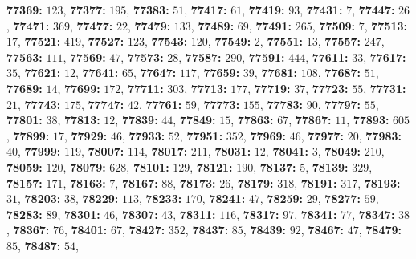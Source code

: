 \textsf{\bfseries 77369:} $123$, \textsf{\bfseries 77377:} $195$, \textsf{\bfseries 77383:} $51$, \textsf{\bfseries 77417:} $61$, \textsf{\bfseries 77419:} $93$, \textsf{\bfseries 77431:} $7$, \textsf{\bfseries 77447:} $26$, \textsf{\bfseries 77471:} $369$, \textsf{\bfseries 77477:} $22$, \textsf{\bfseries 77479:} $133$, \textsf{\bfseries 77489:} $69$, \textsf{\bfseries 77491:} $265$, \textsf{\bfseries 77509:} $7$, \textsf{\bfseries 77513:} $17$, \textsf{\bfseries 77521:} $419$, \textsf{\bfseries 77527:} $123$, \textsf{\bfseries 77543:} $120$, \textsf{\bfseries 77549:} $2$, \textsf{\bfseries 77551:} $13$, \textsf{\bfseries 77557:} $247$, \textsf{\bfseries 77563:} $111$, \textsf{\bfseries 77569:} $47$, \textsf{\bfseries 77573:} $28$, \textsf{\bfseries 77587:} $290$, \textsf{\bfseries 77591:} $444$, \textsf{\bfseries 77611:} $33$, \textsf{\bfseries 77617:} $35$, \textsf{\bfseries 77621:} $12$, \textsf{\bfseries 77641:} $65$, \textsf{\bfseries 77647:} $117$, \textsf{\bfseries 77659:} $39$, \textsf{\bfseries 77681:} $108$, \textsf{\bfseries 77687:} $51$, \textsf{\bfseries 77689:} $14$, \textsf{\bfseries 77699:} $172$, \textsf{\bfseries 77711:} $303$, \textsf{\bfseries 77713:} $177$, \textsf{\bfseries 77719:} $37$, \textsf{\bfseries 77723:} $55$, \textsf{\bfseries 77731:} $21$, \textsf{\bfseries 77743:} $175$, \textsf{\bfseries 77747:} $42$, \textsf{\bfseries 77761:} $59$, \textsf{\bfseries 77773:} $155$, \textsf{\bfseries 77783:} $90$, \textsf{\bfseries 77797:} $55$, \textsf{\bfseries 77801:} $38$, \textsf{\bfseries 77813:} $12$, \textsf{\bfseries 77839:} $44$, \textsf{\bfseries 77849:} $15$, \textsf{\bfseries 77863:} $67$, \textsf{\bfseries 77867:} $11$, \textsf{\bfseries 77893:} $605$, \textsf{\bfseries 77899:} $17$, \textsf{\bfseries 77929:} $46$, \textsf{\bfseries 77933:} $52$, \textsf{\bfseries 77951:} $352$, \textsf{\bfseries 77969:} $46$, \textsf{\bfseries 77977:} $20$, \textsf{\bfseries 77983:} $40$, \textsf{\bfseries 77999:} $119$, \textsf{\bfseries 78007:} $114$, \textsf{\bfseries 78017:} $211$, \textsf{\bfseries 78031:} $12$, \textsf{\bfseries 78041:} $3$, \textsf{\bfseries 78049:} $210$, \textsf{\bfseries 78059:} $120$, \textsf{\bfseries 78079:} $628$, \textsf{\bfseries 78101:} $129$, \textsf{\bfseries 78121:} $190$, \textsf{\bfseries 78137:} $5$, \textsf{\bfseries 78139:} $329$, \textsf{\bfseries 78157:} $171$, \textsf{\bfseries 78163:} $7$, \textsf{\bfseries 78167:} $88$, \textsf{\bfseries 78173:} $26$, \textsf{\bfseries 78179:} $318$, \textsf{\bfseries 78191:} $317$, \textsf{\bfseries 78193:} $31$, \textsf{\bfseries 78203:} $38$, \textsf{\bfseries 78229:} $113$, \textsf{\bfseries 78233:} $170$, \textsf{\bfseries 78241:} $47$, \textsf{\bfseries 78259:} $29$, \textsf{\bfseries 78277:} $59$, \textsf{\bfseries 78283:} $89$, \textsf{\bfseries 78301:} $46$, \textsf{\bfseries 78307:} $43$, \textsf{\bfseries 78311:} $116$, \textsf{\bfseries 78317:} $97$, \textsf{\bfseries 78341:} $77$, \textsf{\bfseries 78347:} $38$, \textsf{\bfseries 78367:} $76$, \textsf{\bfseries 78401:} $67$, \textsf{\bfseries 78427:} $352$, \textsf{\bfseries 78437:} $85$, \textsf{\bfseries 78439:} $92$, \textsf{\bfseries 78467:} $47$, \textsf{\bfseries 78479:} $85$, \textsf{\bfseries 78487:} $54$, 
